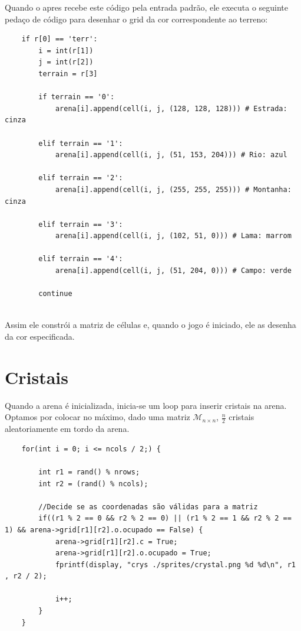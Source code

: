 \documentclass{article}
\begin{document}
    Quando o apres recebe este código pela entrada padrão, ele executa o seguinte pedaço de código para desenhar o grid da cor correspondente ao terreno:
    
    \begin{lstlisting}
    if r[0] == 'terr':
        i = int(r[1])
        j = int(r[2])
        terrain = r[3]
        
        if terrain == '0':
            arena[i].append(cell(i, j, (128, 128, 128))) # Estrada: cinza
            
        elif terrain == '1':
            arena[i].append(cell(i, j, (51, 153, 204))) # Rio: azul
            
        elif terrain == '2':
            arena[i].append(cell(i, j, (255, 255, 255))) # Montanha: cinza
            
        elif terrain == '3':
            arena[i].append(cell(i, j, (102, 51, 0))) # Lama: marrom
            
        elif terrain == '4':
            arena[i].append(cell(i, j, (51, 204, 0))) # Campo: verde
            
        continue
        
    \end{lstlisting}
    
    Assim ele constrói a matriz de células e, quando o jogo é iniciado, ele as desenha da cor especificada.
    
    \section{Cristais}
    Quando a arena é inicializada, inicia-se um loop para inserir cristais na arena. Optamos por colocar no máximo, dado uma matriz $\mathcal{M}_{n\times n}$, $\frac{n}{2}$ cristais aleatoriamente em tordo da arena.
    
    \begin{lstlisting}
    for(int i = 0; i <= ncols / 2;) {
		
		int r1 = rand() % nrows;
		int r2 = (rand() % ncols);
		
		//Decide se as coordenadas são válidas para a matriz
		if((r1 % 2 == 0 && r2 % 2 == 0) || (r1 % 2 == 1 && r2 % 2 == 1) && arena->grid[r1][r2].o.ocupado == False) {
			arena->grid[r1][r2].c = True;
			arena->grid[r1][r2].o.ocupado = True;
			fprintf(display, "crys ./sprites/crystal.png %d %d\n", r1 , r2 / 2);

			i++;
		}
	}
        
    \end{lstlisting}
    
\end{document}
